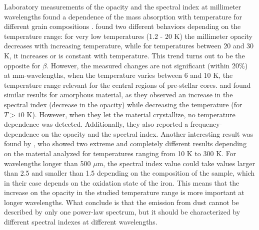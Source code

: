\documentclass{aa}
\begin{document}
Laboratory measurements of the opacity and the spectral index at millimeter wavelengths found a dependence of the mass absorption with temperature for different grain compositions .   found two different behaviors depending on the temperature range: for very low temperatures (1.2 - 20 K) the millimeter opacity decreases with increasing temperature, while for temperatures between 20 and 30 K, it increases or is constant with temperature. This trend turns out to be the opposite for $\beta$. However, the measured changes are not significant (within 20\%) at mm-wavelengths, when the temperature varies between 6 and 10 K, the temperature range relevant for the central regions of pre-stellar cores.  and  found similar results for amorphous material, as they observed an increase in the spectral index (decrease in the opacity) while decreasing the temperature (for $T >10$ K). However, when they let the material crystallize, no temperature dependence was detected. Additionally, they also reported a frequency-dependence on the opacity and the spectral index. Another interesting result was found by , who showed two extreme and completely different results depending on the material analyzed for temperatures ranging from 10 K to 300 K. For wavelengths longer than 500 $\mu$m, the spectral index value could take values larger than 2.5 and smaller than 1.5 depending on the composition of the sample, which in their case depends on the oxidation state of the iron. This means that the increase on the opacity in the studied temperature range is more important at longer wavelengths. What  conclude is that the emission from dust cannot be described by only one power-law spectrum, but it should be characterized by different spectral indexes at different wavelengths. 
\end{document}
